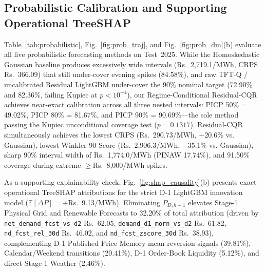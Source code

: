 \documentclass[journal,10pt,twocolumn]{IEEEtran}
\begin{document}
\subsection{Probabilistic Calibration and Supporting Operational TreeSHAP}
Table~\ref{tab:probabilistic}, Fig.~\ref{fig:prob_traj}, and Fig.~\ref{fig:prob_dm}(b) evaluate all five probabilistic forecasting methods on Test~2025. While the Homoskedastic Gaussian baseline produces excessively wide intervals (Rs.~2,719.1/MWh, CRPS Rs.~366.09) that still under-cover evening spikes (84.58\%), and raw TFT-Q / uncalibrated Residual LightGBM under-cover the 90\% nominal target (72.90\% and 82.36\%, failing Kupiec at $p < 10^{-4}$), our Regime-Conditional Residual-CQR achieves near-exact calibration across all three nested intervals: PICP 50\% = 49.02\%, PICP 80\% = 81.67\%, and PICP 90\% = 90.69\%---the sole method passing the Kupiec unconditional coverage test ($p = 0.1317$). Residual-CQR simultaneously achieves the lowest CRPS (Rs.~290.73/MWh, $-$20.6\% vs. Gaussian), lowest Winkler-90 Score (Rs.~2,906.3/MWh, $-$35.1\% vs. Gaussian), sharp 90\% interval width of Rs.~1,774.0/MWh (PINAW 17.74\%), and 91.50\% coverage during extreme $\ge$Rs.~8,000/MWh spikes.

As a supporting explainability check, Fig.~\ref{fig:shap_causality}(b) presents exact operational TreeSHAP attributions for the strict D-1 LightGBM innovation model ($\mathbb{E}[\Delta P] = +$Rs.~9.13/MWh). Eliminating $P_{D,h-1}$ elevates Stage-1 Physical Grid and Renewable Forecasts to 32.20\% of total attribution (driven by \texttt{net\_demand\_fcst\_vs\_d2} Rs.~62.05, \texttt{demand\_d1\_morn\_vs\_d2} Rs.~61.82, \texttt{nd\_fcst\_rel\_30d} Rs.~46.02, and \texttt{nd\_fcst\_zscore\_30d} Rs.~38.93), complementing D-1 Published Price Memory mean-reversion signals (39.81\%), Calendar/Weekend transitions (20.41\%), D-1 Order-Book Liquidity (5.12\%), and direct Stage-1 Weather (2.46\%).
\end{document}

